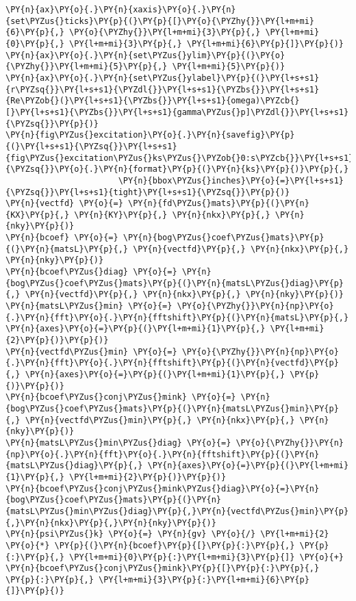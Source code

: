 \begin{Verbatim}[commandchars=\\\{\}]
\PY{n}{ax}\PY{o}{.}\PY{n}{xaxis}\PY{o}{.}\PY{n}{set\PYZus{}ticks}\PY{p}{(}\PY{p}{[}\PY{o}{\PYZhy{}}\PY{l+m+mi}{6}\PY{p}{,} \PY{o}{\PYZhy{}}\PY{l+m+mi}{3}\PY{p}{,} \PY{l+m+mi}{0}\PY{p}{,} \PY{l+m+mi}{3}\PY{p}{,} \PY{l+m+mi}{6}\PY{p}{]}\PY{p}{)}
\PY{n}{ax}\PY{o}{.}\PY{n}{set\PYZus{}ylim}\PY{p}{(}\PY{o}{\PYZhy{}}\PY{l+m+mi}{5}\PY{p}{,} \PY{l+m+mi}{5}\PY{p}{)}
\PY{n}{ax}\PY{o}{.}\PY{n}{set\PYZus{}ylabel}\PY{p}{(}\PY{l+s+s1}{r\PYZsq{}}\PY{l+s+s1}{\PYZdl{}}\PY{l+s+s1}{\PYZbs{}}\PY{l+s+s1}{Re\PYZob{}(}\PY{l+s+s1}{\PYZbs{}}\PY{l+s+s1}{omega)\PYZcb{}[}\PY{l+s+s1}{\PYZbs{}}\PY{l+s+s1}{gamma\PYZus{}p]\PYZdl{}}\PY{l+s+s1}{\PYZsq{}}\PY{p}{)}
\PY{n}{fig\PYZus{}excitation}\PY{o}{.}\PY{n}{savefig}\PY{p}{(}\PY{l+s+s1}{\PYZsq{}}\PY{l+s+s1}{fig\PYZus{}excitation\PYZus{}ks\PYZus{}\PYZob{}0:s\PYZcb{}}\PY{l+s+s1}{\PYZsq{}}\PY{o}{.}\PY{n}{format}\PY{p}{(}\PY{n}{ks}\PY{p}{)}\PY{p}{,}
                       \PY{n}{bbox\PYZus{}inches}\PY{o}{=}\PY{l+s+s1}{\PYZsq{}}\PY{l+s+s1}{tight}\PY{l+s+s1}{\PYZsq{}}\PY{p}{)}
\PY{n}{vectfd} \PY{o}{=} \PY{n}{fd\PYZus{}mats}\PY{p}{(}\PY{n}{KX}\PY{p}{,} \PY{n}{KY}\PY{p}{,} \PY{n}{nkx}\PY{p}{,} \PY{n}{nky}\PY{p}{)}
\PY{n}{bcoef} \PY{o}{=} \PY{n}{bog\PYZus{}coef\PYZus{}mats}\PY{p}{(}\PY{n}{matsL}\PY{p}{,} \PY{n}{vectfd}\PY{p}{,} \PY{n}{nkx}\PY{p}{,} \PY{n}{nky}\PY{p}{)}
\PY{n}{bcoef\PYZus{}diag} \PY{o}{=} \PY{n}{bog\PYZus{}coef\PYZus{}mats}\PY{p}{(}\PY{n}{matsL\PYZus{}diag}\PY{p}{,} \PY{n}{vectfd}\PY{p}{,} \PY{n}{nkx}\PY{p}{,} \PY{n}{nky}\PY{p}{)}
\PY{n}{matsL\PYZus{}min} \PY{o}{=} \PY{o}{\PYZhy{}}\PY{n}{np}\PY{o}{.}\PY{n}{fft}\PY{o}{.}\PY{n}{fftshift}\PY{p}{(}\PY{n}{matsL}\PY{p}{,} \PY{n}{axes}\PY{o}{=}\PY{p}{(}\PY{l+m+mi}{1}\PY{p}{,} \PY{l+m+mi}{2}\PY{p}{)}\PY{p}{)}
\PY{n}{vectfd\PYZus{}min} \PY{o}{=} \PY{o}{\PYZhy{}}\PY{n}{np}\PY{o}{.}\PY{n}{fft}\PY{o}{.}\PY{n}{fftshift}\PY{p}{(}\PY{n}{vectfd}\PY{p}{,} \PY{n}{axes}\PY{o}{=}\PY{p}{(}\PY{l+m+mi}{1}\PY{p}{,} \PY{p}{)}\PY{p}{)}
\PY{n}{bcoef\PYZus{}conj\PYZus{}mink} \PY{o}{=} \PY{n}{bog\PYZus{}coef\PYZus{}mats}\PY{p}{(}\PY{n}{matsL\PYZus{}min}\PY{p}{,} \PY{n}{vectfd\PYZus{}min}\PY{p}{,} \PY{n}{nkx}\PY{p}{,} \PY{n}{nky}\PY{p}{)}
\PY{n}{matsL\PYZus{}min\PYZus{}diag} \PY{o}{=} \PY{o}{\PYZhy{}}\PY{n}{np}\PY{o}{.}\PY{n}{fft}\PY{o}{.}\PY{n}{fftshift}\PY{p}{(}\PY{n}{matsL\PYZus{}diag}\PY{p}{,} \PY{n}{axes}\PY{o}{=}\PY{p}{(}\PY{l+m+mi}{1}\PY{p}{,} \PY{l+m+mi}{2}\PY{p}{)}\PY{p}{)}
\PY{n}{bcoef\PYZus{}conj\PYZus{}mink\PYZus{}diag}\PY{o}{=}\PY{n}{bog\PYZus{}coef\PYZus{}mats}\PY{p}{(}\PY{n}{matsL\PYZus{}min\PYZus{}diag}\PY{p}{,}\PY{n}{vectfd\PYZus{}min}\PY{p}{,}\PY{n}{nkx}\PY{p}{,}\PY{n}{nky}\PY{p}{)}
\PY{n}{psi\PYZus{}k} \PY{o}{=} \PY{n}{gv} \PY{o}{/} \PY{l+m+mi}{2} \PY{o}{*} \PY{p}{(}\PY{n}{bcoef}\PY{p}{[}\PY{p}{:}\PY{p}{,} \PY{p}{:}\PY{p}{,} \PY{l+m+mi}{0}\PY{p}{:}\PY{l+m+mi}{3}\PY{p}{]} \PY{o}{+} \PY{n}{bcoef\PYZus{}conj\PYZus{}mink}\PY{p}{[}\PY{p}{:}\PY{p}{,} \PY{p}{:}\PY{p}{,} \PY{l+m+mi}{3}\PY{p}{:}\PY{l+m+mi}{6}\PY{p}{]}\PY{p}{)}

\end{Verbatim}
